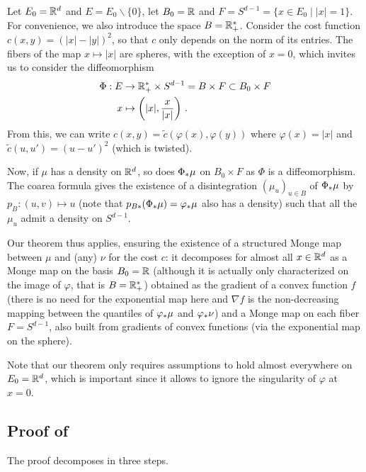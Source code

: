 \begin{example}\label{example:fiber-main}
Let $E_0 = \mathbb{R}^d$ and $E = E_0\backslash \{0\}$, let $B_0 = \mathbb{R}$ and $F = S^{d-1} = \{x \in E_0\mid |x|=1\}$. For convenience, we also introduce the space $B = \mathbb{R}_+^*$.
Consider the cost function $c(x,y) = (|x| - |y|)^2$, so that $c$ only depends on the norm of its entries.
The fibers of the map $x \mapsto |x|$ are spheres, with the exception of $x=0$, which invites us to consider the diffeomorphism
\begin{align*}
\Phi : E &\to \mathbb{R}_+^* \times S^{d-1} = B \times F \subset B_0 \times F \\
x &\mapsto \left(|x|, \frac{x}{|x|}\right)\,.
\end{align*}
From this, we can write $c(x,y) = \tilde{c}(\varphi(x),\varphi(y))$ where $\varphi(x) = |x|$ and $\tilde{c}(u,u') = (u - u')^2$ (which is twisted).

Now, if $\mu$ has a density on $\mathbb{R}^d$, so does $\Phi_* \mu$ on $B_0 \times F$ as $\Phi$ is a diffeomorphism.
The coarea formula gives the existence of a disintegration $(\mu_u)_{u \in B}$ of $\Phi_*\mu$ by $p_B : (u,v) \mapsto u$ (note that $p_{B*}(\Phi_*\mu) = \varphi_*\mu$ also has a density) such that all the $\mu_u$ admit a density on $S^{d-1}$.

Our theorem thus applies, ensuring the existence of a structured Monge map between $\mu$ and (any) $\nu$ for the cost $c$: it decomposes for almost all $x \in \mathbb{R}^d$ as a Monge map on the basis $B_0 = \mathbb{R}$ (although it is actually only characterized on the image of $\varphi$, that is $B = \mathbb{R}_+^*$) obtained as the gradient of a convex function $f$ (there is no need for the exponential map here and $\nabla f$ is the non-decreasing mapping between the quantiles of $\varphi_*\mu$ and $\varphi_*\nu$) and a Monge map on each fiber $F = S^{d-1}$, also built from gradients of convex functions (via the exponential map on the sphere).

Note that our theorem only requires assumptions to hold almost everywhere on $E_0 = \mathbb{R}^d$, which is important since it allows to ignore the singularity of $\varphi$ at $x = 0$.
\end{example}

\subsection{Proof of }
\label{subsec:proof-nonsense}

The proof decomposes in three steps.
